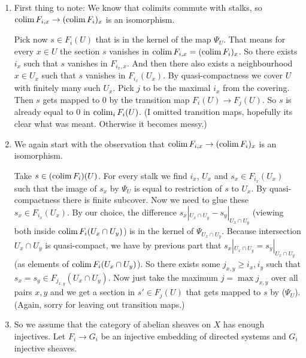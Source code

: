 \begin{exercise}{4}
    \begin{enumerate}
        \item{
                First thing to note:
                We know that colimits commute with stalks, so
                $\operatorname{colim} F_{i, x} \to (\operatorname{colim} F_i)_x$ is an isomorphism.
                
                Pick now $s \in F_i(U)$ that is in the kernel of the map
                $\Psi_U$. That means for every $x \in U$ the section $s$
                vanishes in $\operatorname{colim} F_{i, x} = (\operatorname{colim} F_i)_x$.
                So there exists $i_x$ such that $s$ vanishes in $F_{i_x, x}$.
                And then there also exists a neighbourhood $x \in U_x$ such that
                $s$ vanishes in $F_{i_x}(U_x)$.
                By quasi-compactness we cover $U$ with finitely many such $U_x$.
                Pick $j$ to be the maximal $i_x$ from the covering. Then $s$
                gets mapped to $0$ by the transition map $F_i(U) \to F_j(U)$.
                So $s$ is already equal to $0$ in $\operatorname{colim}_i F_i(U)$.
                (I omitted transition maps, hopefully its clear what was meant.
                Otherwise it becomes messy.)
            }
        \item{
                We again start with the observation that 
                $\operatorname{colim} F_{i, x} \to (\operatorname{colim} F_i)_x$ is an isomorphism.

                Take $s \in (\operatorname{colim} F_i)(U)$. For every stalk we find $i_x$,
                $U_x$ and $s_x \in F_{i_x}(U_x)$ such that the image of $s_x$ by
                $\Psi_U$ is equal to restriction of $s$ to $U_x$. By
                quasi-compactness there is finite subcover. Now we need to glue
                these $s_x \in F_{i_x}(U_x)$. By our choice, the difference $s_x
                |_{U_x \cap U_y} - s_y |_{U_x \cap U_y}$ (viewing both
                inside $\operatorname{colim} F_i(U_x \cap U_y)$) is in the kernel of
                $\Psi_{U_x \cap U_y}$. Because intersection $U_x \cap U_y$ is
                quasi-compact, we have by previous part that $s_x |_{U_x \cap
                U_y} = s_y |_{U_x \cap U_y}$ (as elements of $\operatorname{colim} F_i(U_x
                \cap U_y)$). So there exists some $j_{x, y} \geq i_x, i_y$ such
                that $s_x = s_y \in F_{j_{x, y}}(U_x \cap U_y)$. Now just take
                the maximum $j = \max j_{x, y}$ over all pairs $x, y$ and we get
                a section in $s' \in F_j(U)$ that gets mapped to $s$ by
                ($\Psi_U$).
                (Again, sorry for leaving out transition maps.)
            }
        \item{
                So we assume that the category of abelian sheaves on $X$ has
                enough injectives. Let $F_i \to G_i$ be an injective embedding
                of directed systems and $G_i$ injective sheaves.

}
\end{enumerate}
\end{exercise}
